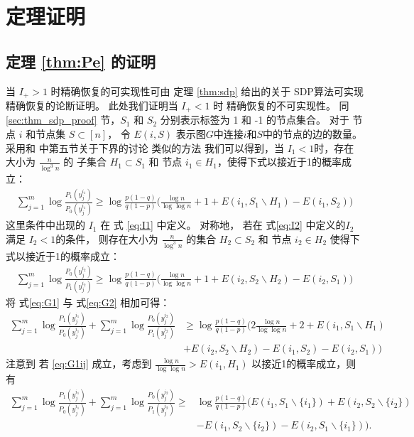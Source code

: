 \section{定理证明}
\subsection{定理 \ref{thm:Pe} 的证明}
当 $I_+ > 1$ 时精确恢复的可实现性可由 定理 \ref{thm:sdp}  给出的关于 SDP算法可实现精确恢复的论断证明。
此处我们证明当 $I_+ < 1$ 时  %
精确恢复的不可实现性。
同 \ref{sec:thm_sdp_proof} 节，$S_1$ 和 $S_2$ 分别表示标签为 1 和 -1 的节点集合。
对于 节点 $i$ 和节点集 $S\subset [n]$，
令 $E(i,S)$ 表示图$G$中连接$i$和$S$中的节点的边的数量。
采用和 \cite{abbe2015exact} 中第五节关于下界的讨论 类似的方法
我们可以得到，当 $I_1<1$时，存在大小为 $\frac{n}{\log^3 n}$  的 子集合
    $H_1\subset S_1$ 和 节点 $i_1\in H_1$，使得下式以接近于1的概率成立：
\begin{align}
    \sum_{j=1}^{m} \log \frac{P_1(y^{i_1}_{j})}{P_0(y^{i_1}_{j})}
    \ge \log \frac{p(1-q)}{q(1-p)}\Big(\frac{\log n}{\log\log n}+1
    +E(i_1, S_1 \backslash H_1) - E(i_1, S_2) \Big) \label{eq:G1}
\end{align}
这里条件中出现的 $I_1$ 在 式 \eqref{eq:I1} 中定义。
对称地， 若在 式\eqref{eq:I2} 中定义的$I_2$满足  $I_2<1$的条件，
则存在大小为 $\frac{n}{\log^3 n}$  的集合
    $H_2\subset S_2$ 和 节点 $i_2\in H_2$ 使得下式以接近于1的概率成立：
    \begin{align}
        \sum_{j=1}^{m} \log \frac{P_0(y^{i_2}_{j})}{P_1(y^{i_2}_{j})}
        \ge \log \frac{p(1-q)}{q(1-p)}\Big(\frac{\log n}{\log\log n}+1
        +E(i_2, S_2 \backslash H_2) - E(i_2, S_1) \Big) \label{eq:G2}
    \end{align}	
将 式\eqref{eq:G1} 与 式\eqref{eq:G2} 相加可得：
\begin{align}
    \sum_{j=1}^{m} \log \frac{P_1(y^{i_1}_{j})}{P_0(y^{i_1}_{j})}
    +\sum_{j=1}^{m} \log \frac{P_0(y^{i_2}_{j})}{P_1(y^{i_2}_{j})}
    &\ge \log \frac{p(1-q)}{q(1-p)}\Big(2\frac{\log n}{\log\log n}+2+E(i_1, S_1 \backslash H_1) \nonumber\\
    &+ E(i_2, S_2 \backslash H_2)- E(i_1, S_2 ) - E(i_2, S_1 )\Big) \label{eq:G1ij}
\end{align}	
    注意到 若 \eqref{eq:G1ij} 成立，考虑到 $\frac{\log n}{\log \log n} > E(i_1, H_1)$ 
    以接近1的概率成立，则有
\begin{align}
    \sum_{j=1}^{m} \log \frac{P_1(y^{i_1}_{j})}{P_0(y^{i_1}_{j})}
    +\sum_{j=1}^{m} \log \frac{P_0(y^{i_2}_{j})}{P_1(y^{i_2}_{j})}
    \ge &\log \frac{p(1-q)}{q(1-p)}(E(i_1, S_1 \backslash \{i_1\}) + E(i_2, S_2 \backslash \{i_2\})\nonumber\\
    &- E(i_1, S_2 \backslash \{i_2\}) - E(i_2, S_1 \backslash \{i_1\})) \label{eq:F1ij}.
\end{align}
